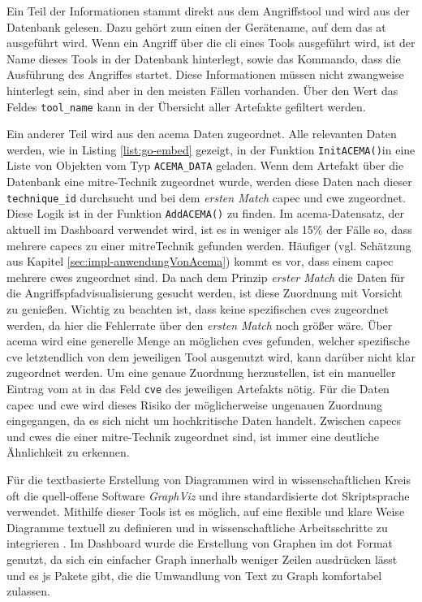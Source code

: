 \par Ein Teil der Informationen stammt direkt aus dem Angriffstool und wird aus der Datenbank gelesen. Dazu gehört zum einen der Gerätename, auf dem das \gls{at} ausgeführt wird. Wenn ein Angriff über die \gls{cli} eines Tools ausgeführt wird, ist der Name dieses Tools in der Datenbank hinterlegt, sowie das Kommando, dass die Ausführung des Angriffes startet. Diese Informationen müssen nicht zwangweise hinterlegt sein, sind aber in den meisten Fällen vorhanden. Über den Wert das Feldes \verb|tool_name| kann in der Übersicht aller Artefakte gefiltert werden.
\par Ein anderer Teil wird aus den \gls{acema} Daten zugeordnet. Alle relevanten Daten werden, wie in Listing \ref{list:go-embed} gezeigt, in der Funktion \verb|InitACEMA()|in eine Liste von Objekten vom Typ \verb|ACEMA_DATA| geladen. Wenn dem Artefakt über die Datenbank eine \gls{mitre}-Technik zugeordnet wurde, werden diese Daten nach dieser \verb|technique_id| durchsucht und bei dem \textit{ersten Match} \gls{capec} und \gls{cwe} zugeordnet. Diese Logik ist in der Funktion \verb|AddACEMA()| zu finden. Im \gls{acema}-Datensatz, der aktuell im Dashboard verwendet wird, ist es in weniger als 15\% der Fälle so, dass mehrere \glspl{capec} zu einer \gls{mitre}Technik gefunden werden. Häufiger (vgl. Schätzung aus Kapitel \ref{sec:impl-anwendungVonAcema}) kommt es vor, dass einem \gls{capec} mehrere \glspl{cwe} zugeordnet sind. Da nach dem Prinzip \textit{erster Match} die Daten für die Angriffspfadvisualisierung gesucht werden, ist diese Zuordnung mit Vorsicht zu genießen. Wichtig zu beachten ist, dass keine spezifischen \glspl{cve} zugeordnet werden, da hier die Fehlerrate über den \textit{ersten Match} noch größer wäre. Über \gls{acema} wird eine generelle Menge an möglichen \glspl{cve} gefunden, welcher spezifische \gls{cve} letztendlich von dem jeweiligen Tool ausgenutzt wird, kann darüber nicht klar zugeordnet werden. Um eine genaue Zuordnung herzustellen, ist ein manueller Eintrag vom \gls{at} in das Feld \verb|cve| des jeweiligen Artefakts nötig. Für die Daten \gls{capec} und \gls{cwe} wird dieses Risiko der möglicherweise ungenauen Zuordnung eingegangen, da es sich nicht um hochkritische Daten handelt. Zwischen \glspl{capec} und \glspl{cwe} die einer \gls{mitre}-Technik zugeordnet sind, ist immer eine deutliche Ähnlichkeit zu erkennen.
\par Für die textbasierte Erstellung von Diagrammen wird in wissenschaftlichen Kreis oft die quell-offene Software \textit{GraphViz} und ihre standardisierte \gls{dot} Skriptsprache verwendet. Mithilfe dieser Tools ist es möglich, auf eine flexible und klare Weise Diagramme textuell zu definieren und in wissenschaftliche Arbeitsschritte zu integrieren \autocite{Graphviz,DOTLanguage}. Im Dashboard wurde die Erstellung von Graphen im \gls{dot} Format genutzt, da sich ein einfacher Graph innerhalb weniger Zeilen ausdrücken lässt und es \gls{js} Pakete gibt, die die Umwandlung von Text zu Graph komfortabel zulassen.
